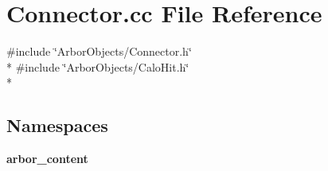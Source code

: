 \section{Connector.\+cc File Reference}
\label{Connector_8cc}
{\ttfamily \#include \char`\"{}Arbor\+Objects/\+Connector.\+h\char`\"{}}\\*
{\ttfamily \#include \char`\"{}Arbor\+Objects/\+Calo\+Hit.\+h\char`\"{}}\\*
\subsection*{Namespaces}
\begin{DoxyCompactItemize}
\item 
 {\bf arbor\+\_\+content}
\end{DoxyCompactItemize}
